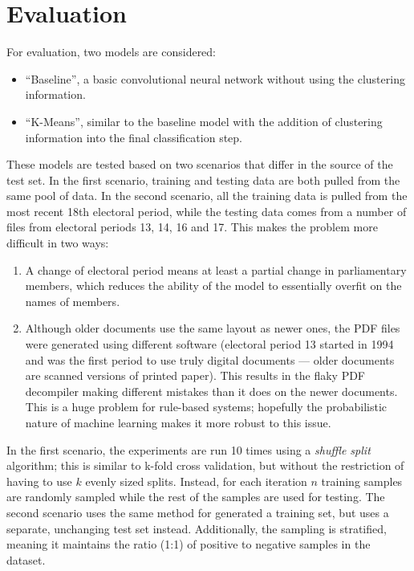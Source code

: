 \section{Evaluation}
\FloatBarrier%

For evaluation, two models are considered:
\begin{itemize}
  \item ``Baseline'', a basic convolutional neural network without using the
    clustering information.
  \item ``K-Means'', similar to the baseline model with the addition of
    clustering information into the final classification step.
\end{itemize}
These models are tested based on two scenarios that differ in the source of the
test set. In the first scenario, training and testing data are both pulled from
the same pool of data. In the second scenario, all the training data is
pulled from the most recent 18th electoral period, while the testing data comes
from a number of files from electoral periods 13, 14, 16 and 17. This makes the
problem more difficult in two ways:
\begin{enumerate}
  \item A change of electoral period means at least a partial change in
    parliamentary members, which reduces the ability of the model to essentially
    overfit on the names of members.
  \item Although older documents use the same layout as newer ones, the PDF
    files were generated using different software (electoral period 13 started
    in 1994 and was the first period to use truly  digital documents --- older
    documents are scanned versions of printed paper). This results in the flaky
    PDF decompiler making different mistakes than it does on the newer
    documents. This is a huge problem for rule-based systems; hopefully the
    probabilistic nature of machine learning makes it more robust to this issue.
\end{enumerate}
In the first scenario, the experiments are run 10 times using a \emph{shuffle
split} algorithm; this is similar to k-fold cross validation, but without the
restriction of having to use $k$ evenly sized splits. Instead, for each
iteration $n$ training samples are randomly sampled while the rest of the
samples are used for testing. The second scenario uses the same method for
generated a training set, but uses a separate, unchanging test set instead.
Additionally, the sampling is stratified, meaning it maintains the ratio (1:1)
of positive to negative samples in the dataset.

